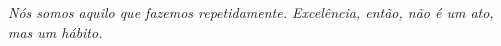 \begin{epigrafe}
  \vspace*{\fill}
  \noindent\hspace{.45\textwidth}%
  \begin{minipage}{.55\textwidth}
    \raggedright
    \textit{Nós somos aquilo que fazemos repetidamente. Excelência,
    então, não é um ato, mas um hábito.}

    \begin{flushright}\cite[tradução nossa]{durant1926}\end{flushright}
  \end{minipage}
\end{epigrafe}
